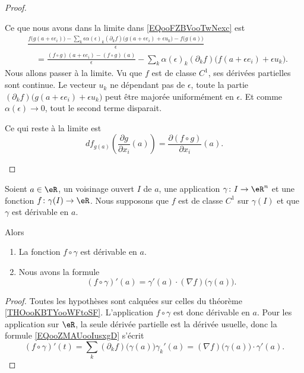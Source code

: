 \begin{proof}
\begin{subproof}
\begin{equation}
		\end{equation}
		Ce que nous avons dans la limite dans \eqref{EQooFZBVooTwNexc} est
		\begin{subequations}
			\begin{align}
				 & \frac{ f\big( g(a+\epsilon e_i)\big)-\sum_k\epsilon\alpha(\epsilon)_k (\partial_kf)\big( g(a+\epsilon e_i)+\epsilon u_k \big)-f\big( g(a) \big) }{ \epsilon } \\
				 & \quad=\frac{ (f\circ g)(a+\epsilon e_i)-(f\circ g)(a) }{ \epsilon }
				-\sum_k\alpha(\epsilon)_k(\partial_kf)\big( f(a+\epsilon e_i)+\epsilon u_k \big).
			\end{align}
		\end{subequations}
		Nous allons passer à la limite. Vu que \( f\) est de classe \( C^1\), ses dérivées partielles sont continue. Le vecteur \( u_k\) ne dépendant pas de \( \epsilon\), toute la partie \( (\partial_kf)\big( g(a+\epsilon e_i)+\epsilon u_k \big)\) peut être majorée uniformément en \( \epsilon\). Et comme \( \alpha(\epsilon)\to 0\), tout le second terme disparait.

		Ce qui reste à la limite est
		\begin{equation}
			df_{g(a)}\left( \frac{ \partial g }{ \partial x_i }(a) \right)=\frac{ \partial (f\circ g) }{ \partial x_i }(a).
		\end{equation}
	\end{subproof}
\end{proof}

\begin{corollary}		\label{CORooNQURooAWjfcA}
	Soient \( a\in \eR\), un voisinage ouvert \( I\) de \( a\), une application \(\gamma \colon I\to \eR^n  \) et une fonction \(f \colon \gamma(I)\to \eR  \). Nous supposons que \( f\) est de classe \( C^1\) sur \( \gamma(I)\) et que \( \gamma\) est dérivable en \( a\).

	Alors
	\begin{enumerate}
		\item
		      La fonction \( f\circ \gamma\) est dérivable en \( a\).
		\item
		      Nous avons la formule
		      \begin{equation}
			      (f\circ \gamma)'(a)=\gamma'(a)\cdot (\nabla f)\big( \gamma(a) \big).
		      \end{equation}
	\end{enumerate}
\end{corollary}

\begin{proof}
	Toutes les hypothèses sont calquées sur celles du théorème \ref{THOooKBTYooWFtoSF}. L'application \( f\circ \gamma\) est donc dérivable en \( a\). Pour les application sur \( \eR\), la seule dérivée partielle est la dérivée usuelle, donc la formule \eqref{EQooZMAUooIusxgD} s'écrit
	\begin{equation}
		(f\circ \gamma)'(t)=\sum_k(\partial_kf)\big( \gamma(a) \big)\gamma_k'(a)=(\nabla f)\big( \gamma(a) \big)\cdot \gamma'(a).
	\end{equation}
\end{proof}

